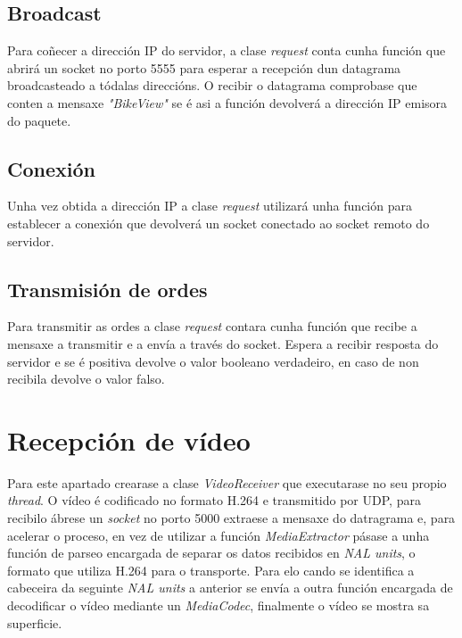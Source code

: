 \subsection{Broadcast}
Para coñecer a dirección IP do servidor, a clase \emph{request} conta cunha función que abrirá un socket no porto 5555 para esperar a recepción dun datagrama broadcasteado a tódalas direccións. O recibir o datagrama comprobase que conten a mensaxe \emph{"BikeView"} se é asi a función devolverá a dirección IP emisora do paquete.

\subsection{Conexión}
Unha vez obtida a dirección IP a clase \emph{request} utilizará unha función para establecer a conexión que devolverá un socket conectado ao socket remoto do servidor.

\subsection{Transmisión de ordes}
Para transmitir as ordes a clase \emph{request} contara cunha función que recibe a mensaxe a transmitir e a envía a través do socket. Espera a recibir resposta do servidor e se é positiva devolve o valor booleano verdadeiro, en caso de non recibila devolve o valor falso.

\section{Recepción de vídeo}
Para este apartado crearase a clase \emph{VideoReceiver} que executarase no seu propio \emph{thread}. O vídeo é codificado no formato H.264 e transmitido por UDP, para recibilo ábrese un \emph{socket} no porto 5000 extraese a mensaxe do datragrama e, para acelerar o proceso, en vez de utilizar a función \emph{MediaExtractor} pásase a unha función de parseo encargada de separar os datos recibidos en \emph{NAL units}, o formato que utiliza H.264 para o transporte. Para elo cando se identifica a cabeceira da seguinte \emph{NAL units} a anterior se envía a outra función encargada de decodificar o vídeo mediante un \emph{MediaCodec}, finalmente o vídeo se mostra sa superficie.

